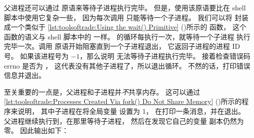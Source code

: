 \begin{listing}

\caption{使用  原语}
\label{lst:toolsoftrade:Using the wait() Primitive}
\end{listing}

\begin{fcvref}
父进程还可以通过  原语来等待子进程执行完毕。
但是，使用该原语要比在 shell 脚本中使用它复杂一些，
因为每次调用  只能等待一个子进程。
我们可以将  封装成一个类似于
\cref{lst:toolsoftrade:Using the wait() Primitive}
()所示的  函数，
这个  函数的语义与 shell 脚本中的  一样。
的循环每执行一次，就等待一个子进程
执行完毕一次。调用  原语开始阻塞直到一个子进程退出，
它返回子进程的进程 ID 号。
如果该进程号为 $-1$，那么说明  无法等待子进程执行完毕。
接着检查错误码 errno 是否为 ，
这代表没有其他子进程了，所以退出循环。
不然的话，打印错误信息并退出。
\end{fcvref}

\QuickQuizEnd

\begin{listing}

\caption{通过  创建的进程不共享内存}
\label{lst:toolsoftrade:Processes Created Via fork() Do Not Share Memory}
\end{listing}

\begin{fcvref}
至关重要的一点是，父进程和子进程并\emph{不}共享内存。
这可以通过
\cref{lst:toolsoftrade:Processes Created Via fork() Do Not Share Memory}
()所示的程序来说明，
其中子进程在将全局变量  设置为 1，
在打印一条消息，并在退出。
父进程继续执行到，在那里等待子进程，
然后在发现它自己的变量  副本仍然为零。
因此输出如下：
\end{fcvref}

